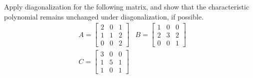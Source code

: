 \begin{Exercise}
Apply diagonalization for the following matrix, and show that the characteristic polynomial remains unchanged under diagonalization, if possible.
\begin{align*}
&A =
\begin{bmatrix}
2 & 0 & 1\\
1 & 1 & 2\\
0 & 0 & 2
\end{bmatrix} 
&B =
\begin{bmatrix}
1 & 0 & 0\\
2 & 3 & 2\\
0 & 0 & 1
\end{bmatrix} \\
&C = 
\begin{bmatrix}
3 & 0 & 0\\
1 & 5 & 1\\
1 & 0 & 1
\end{bmatrix} 
\end{align*}
\end{Exercise}
